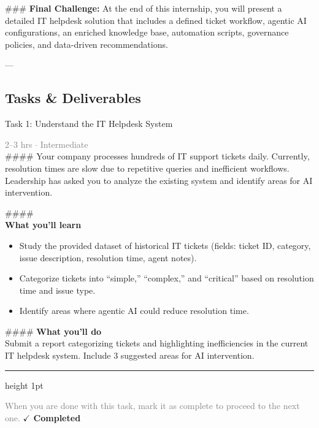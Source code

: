 \documentclass[10pt,a4paper]{article}
\begin{document}
\#\#\# \textbf{Final Challenge:}  
At the end of this internship, you will present a detailed IT helpdesk solution that includes a defined ticket workflow, agentic AI configurations, an enriched knowledge base, automation scripts, governance policies, and data-driven recommendations.  

---

\subsection*{Tasks \& Deliverables}

\begin{taskbox}{Task 1: Understand the IT Helpdesk System}

    {\small \textcolor{gray}{2--3 hrs $\cdot$ Intermediate}}\\[12pt]

    \#\#\#\#   
Your company processes hundreds of IT support tickets daily. Currently, resolution times are slow due to repetitive queries and inefficient workflows. Leadership has asked you to analyze the existing system and identify areas for AI intervention.  

\#\#\#\# \\[10pt]
\vspace{8pt}
{\large \textbf{\textcolor{brandLight}{What you'll learn}}}\\[4pt]  
\begin{itemize}
    \item Study the provided dataset of historical IT tickets (fields: ticket ID, category, issue description, resolution time, agent notes).  
    \item Categorize tickets into “simple,” “complex,” and “critical” based on resolution time and issue type.  
    \item Identify areas where agentic AI could reduce resolution time.  
\end{itemize}

\#\#\#\# \vspace{8pt}
{\large \textbf{\textcolor{brandLight}{What you'll do}}}\\[4pt]  
Submit a report categorizing tickets and highlighting inefficiencies in the current IT helpdesk system. Include 3 suggested areas for AI intervention.\par

    \vspace{16pt}

    \textcolor{cardBorder}{\hrule height 1pt}\vspace{8pt}

    \small \textcolor{gray}{When you are done with this task, mark it as complete to proceed to the next one.} \hfill \textbf{\textcolor{brandDark}{$\checkmark$ Completed}}

\end{taskbox}
\end{document}
